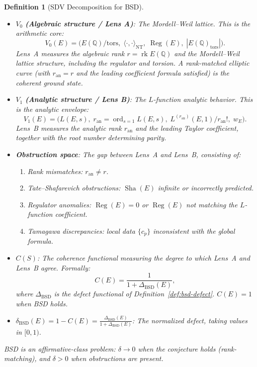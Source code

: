 \documentclass[11pt]{article}
\newtheorem{definition}[theorem]{Definition}
\DeclareMathOperator{\rk}{rk}
\DeclareMathOperator{\ord}{ord}
\DeclareMathOperator{\Reg}{Reg}
\DeclareMathOperator{\Sha}{Sha}
\begin{document}
\begin{definition}[SDV Decomposition for BSD]
\label{def:sdv}
\leavevmode
\begin{itemize}
  \item $V_0$ \textbf{(Algebraic structure / Lens A)}: The Mordell--Weil
    lattice.  This is the arithmetic core:
    \[
      V_0(E) = \bigl(E(\mathbb{Q})/\mathrm{tors},\;
        \langle\cdot,\cdot\rangle_{\mathrm{NT}},\;
        \Reg(E),\; |E(\mathbb{Q})_{\mathrm{tors}}|\bigr).
    \]
    Lens~A measures the \emph{algebraic rank} $r = \rk E(\mathbb{Q})$ and the
    Mordell--Weil lattice structure, including the regulator and torsion.
    A rank-matched elliptic curve (with $r_{\mathrm{an}} = r$ and the leading
    coefficient formula satisfied) is the coherent ground state.

  \item $V_1$ \textbf{(Analytic structure / Lens B)}: The $L$-function
    analytic behavior.  This is the analytic envelope:
    \[
      V_1(E) = \bigl(L(E,s),\; r_{\mathrm{an}} = \ord_{s=1} L(E,s),\;
        L^{(r_{\mathrm{an}})}(E,1)/r_{\mathrm{an}}!,\; w_E\bigr).
    \]
    Lens~B measures the \emph{analytic rank} $r_{\mathrm{an}}$ and the leading
    Taylor coefficient, together with the root number determining parity.

  \item \textbf{Obstruction space}: The gap between Lens~A and Lens~B,
    consisting of:
    \begin{enumerate}
      \item Rank mismatches: $r_{\mathrm{an}} \neq r$.
      \item Tate--Shafarevich obstructions: $\Sha(E)$ infinite or incorrectly
        predicted.
      \item Regulator anomalies: $\Reg(E) = 0$ or $\Reg(E)$ not matching the
        $L$-function coefficient.
      \item Tamagawa discrepancies: local data $\{c_p\}$ inconsistent with
        the global formula.
    \end{enumerate}

  \item $C(S)$: The coherence functional measuring the degree to which
    Lens~A and Lens~B agree.  Formally:
    \[
      C(E) = \frac{1}{1 + \Delta_{\mathrm{BSD}}(E)},
    \]
    where $\Delta_{\mathrm{BSD}}$ is the defect functional of
    Definition~\ref{def:bsd-defect}.  $C(E) = 1$ when BSD holds.

  \item $\delta_{\mathrm{BSD}}(E) = 1 - C(E) =
    \frac{\Delta_{\mathrm{BSD}}(E)}{1 + \Delta_{\mathrm{BSD}}(E)}$: The
    normalized defect, taking values in $[0,1)$.
\end{itemize}

BSD is an \emph{affirmative-class} problem: $\delta \to 0$ when the conjecture
holds (rank-matching), and $\delta > 0$ when obstructions are present.
\end{definition}
\end{document}
